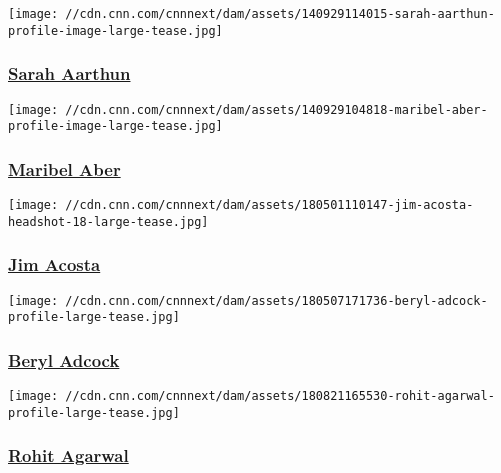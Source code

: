 \href{/profiles/sarah-aarthun}{}

\texttt{[image: //cdn.cnn.com/cnnnext/dam/assets/140929114015-sarah-aarthun-profile-image-large-tease.jpg]}

\hypertarget{sarah-aarthun}{%
\subsubsection{\texorpdfstring{\href{/profiles/sarah-aarthun}{Sarah
Aarthun}}{Sarah Aarthun}}\label{sarah-aarthun}}

\href{/profiles/maribel-aber-profile}{}

\texttt{[image: //cdn.cnn.com/cnnnext/dam/assets/140929104818-maribel-aber-profile-image-large-tease.jpg]}

\hypertarget{maribel-aber}{%
\subsubsection{\texorpdfstring{\href{/profiles/maribel-aber-profile}{Maribel
Aber}}{Maribel Aber}}\label{maribel-aber}}

\href{/profiles/jim-acosta-profile}{}

\texttt{[image: //cdn.cnn.com/cnnnext/dam/assets/180501110147-jim-acosta-headshot-18-large-tease.jpg]}

\hypertarget{jim-acosta}{%
\subsubsection{\texorpdfstring{\href{/profiles/jim-acosta-profile}{Jim
Acosta}}{Jim Acosta}}\label{jim-acosta}}

\href{/profiles/beryl-adcock}{}

\texttt{[image: //cdn.cnn.com/cnnnext/dam/assets/180507171736-beryl-adcock-profile-large-tease.jpg]}

\hypertarget{beryl-adcock}{%
\subsubsection{\texorpdfstring{\href{/profiles/beryl-adcock}{Beryl
Adcock}}{Beryl Adcock}}\label{beryl-adcock}}

\href{/profiles/rohit-agarwal-profile}{}

\texttt{[image: //cdn.cnn.com/cnnnext/dam/assets/180821165530-rohit-agarwal-profile-large-tease.jpg]}

\hypertarget{rohit-agarwal}{%
\subsubsection{\texorpdfstring{\href{/profiles/rohit-agarwal-profile}{Rohit
Agarwal}}{Rohit Agarwal}}\label{rohit-agarwal}}

